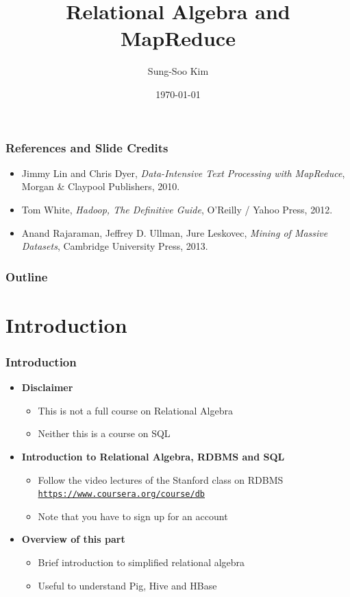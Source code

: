 \documentclass{beamer}
\title[Flying KIWI]{Relational Algebra and MapReduce} %
\author{Sung-Soo Kim} %
\institute[ETRI] %
{
\textit{sungsoo@etri.re.kr} \\ %
\medskip
Data Management Research Section, ETRI %
}
\date{\today} %
\newcommand{\bi}{\begin{itemize}}
\newcommand{\ei}{\end{itemize}}
\newcommand{\ii}{\item}
\begin{document}
\begin{frame}
\titlepage %
\end{frame}

\begin{frame}
\frametitle{References and Slide Credits}
\bi
\ii Jimmy Lin and Chris Dyer, \textit{Data-Intensive Text Processing with MapReduce}, Morgan \& Claypool Publishers, 2010.
\ii Tom White, \textit{Hadoop, The Definitive Guide}, O'Reilly / Yahoo Press, 2012.
\ii Anand Rajaraman, Jeffrey D. Ullman, Jure Leskovec, \textit{Mining of Massive Datasets}, Cambridge University Press, 2013. 
\ei
\end{frame}

\begin{frame}
\frametitle{Outline} %
\tableofcontents 
\end{frame}



\section{Introduction} 

\begin{frame}
\frametitle{Introduction}
\bi
\ii \textbf{Disclaimer}
\bi
\ii This is not a full course on Relational Algebra
\ii Neither this is a course on SQL
\ei
\ei

\bi
\ii \textbf{Introduction to Relational Algebra, RDBMS and SQL}
\bi
\ii Follow the video lectures of the Stanford class on RDBMS \href{https://www.coursera.org/course/db}{\texttt{https://www.coursera.org/course/db}}
\ii Note that you have to sign up for an account 
\ei
\ei

\bi
\ii \textbf{Overview of this part}
\bi
\ii Brief introduction to simplified relational algebra
\ii Useful to understand Pig, Hive and HBase
\ei
\ei
\end{frame}
\end{document}
